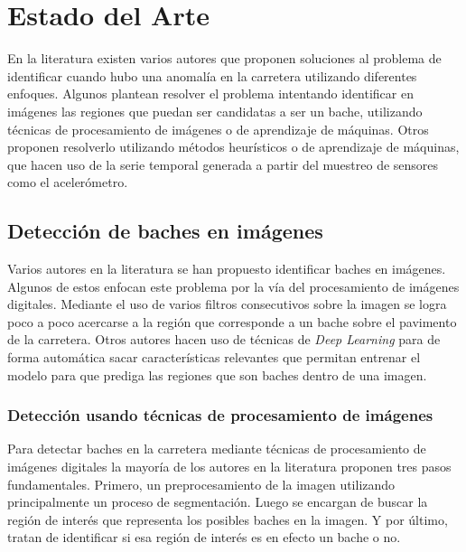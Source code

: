 \chapter{Estado del Arte}\label{chapter:state-of-the-art}
En la literatura existen varios autores que proponen soluciones al problema de identificar cuando hubo una anomalía en la carretera utilizando
diferentes enfoques. Algunos plantean resolver el problema intentando identificar en imágenes las regiones que puedan ser candidatas a ser un 
bache, utilizando  técnicas de procesamiento de imágenes o de aprendizaje de máquinas. Otros proponen resolverlo utilizando métodos heurísticos
o de aprendizaje de máquinas, que hacen uso de la serie temporal generada a partir del muestreo de sensores como el acelerómetro. 

\section{Detección de baches en imágenes}
Varios autores en la literatura se han propuesto identificar baches en imágenes. Algunos de estos enfocan este problema por la vía del
procesamiento de imágenes digitales. Mediante el uso de varios filtros consecutivos  sobre la imagen se logra poco a poco acercarse 
a la región que corresponde a un bache sobre el pavimento de la carretera.  Otros autores hacen uso de técnicas de \emph{Deep Learning}
para de forma automática sacar características relevantes que permitan entrenar el modelo para que prediga las regiones 
que son baches dentro de una imagen.



	\subsection{Detección usando técnicas de procesamiento de imágenes}

		Para detectar baches en la carretera mediante técnicas de procesamiento de imágenes digitales la mayoría de los autores  en la literatura 
		proponen tres pasos fundamentales. Primero, un preprocesamiento de la imagen utilizando principalmente un proceso de segmentación. Luego 
		se encargan de buscar la región de interés que representa los posibles baches en la imagen. Y por último, tratan de identificar si esa 
		región de interés es en efecto un bache o no. 
		
